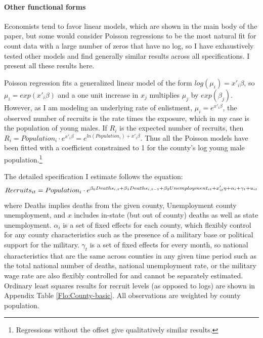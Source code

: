 \documentclass[12pt] {article}
\begin{document}
\paragraph{Other functional forms}
Economists tend to favor linear models, which are shown in the main body of the paper, but some would consider Poisson regressions to be the most natural fit for count data with a large number of zeros that have no log, so I have exhaustively tested other models and find generally similar results across all specifications. I present all these results here. 

Poisson regression fits a generalized linear model of the form $log(\mu_{i})=x'_{i}\beta$, so $\mu_{i}=exp(x'_{i}\beta)$ and a one unit increase in $x_{j}$ multiplies $\mu_{j}$ by $exp(\beta_{j})$. However, as I am modeling an underlying rate of enlistment, $\mu_{i}=e^{x'_{i}\beta}$, the observed number of recruits is the rate times the exposure, which in my case is the population of young males. If $R_{i}$ is the expected number of recruits, then $R_{i}=Population_{i}\cdot e^{x'_{i}\beta}=e^{ln(Population_{i})+x'_{i}\beta}$.
Thus all the Poisson models have been fitted with a coefficient constrained
to 1 for the county's log young male population.\footnote{Regressions without the offset give qualitatively similar results.} 

The detailed specification I estimate follows the equation: 
$$Recruits_{it}=Population_{i}\cdot e^{\beta_{0}Deaths_{i,t}+\beta_{1}Deaths_{i,t-1}+\beta_{2}Unemployment_{it}\\
+x'_{it}\eta+\alpha_{i}+\gamma_{t}+u_{it}}$$
where Deaths implies deaths from the given county, Unemployment county unemployment, and $x$ includes in-state (but out of county) deaths as well as
state unemployment. $\alpha_{i}$ is a set of fixed effects for each county, which flexibly control for any county characteristics such as the presence of a military base or political support for the military. $\gamma_{t}$ is a set of fixed effects for every month,
so national characteristics that are the same across counties in any
given time period such as the total national number of deaths, national
unemployment rate, or the military wage rate are also flexibly controlled for and cannot be separately estimated. 
Ordinary least squares results
 for recruit levels (as opposed to logs) are shown in Appendix Table \ref{Flo:County-basic}. All observations are weighted by county population. 
 
\end{document}
